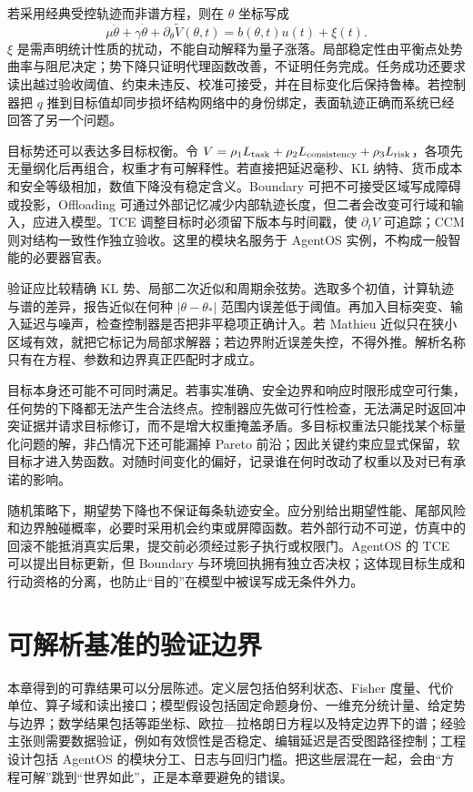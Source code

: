若采用经典受控轨迹而非谱方程，则在 $\theta$ 坐标写成
\[
\mu\ddot\theta+\gamma\dot\theta+\partial_\theta\widetilde V(\theta,t)=b(\theta,t)u(t)+\xi(t).
\]
$\xi$ 是需声明统计性质的扰动，不能自动解释为量子涨落。局部稳定性由平衡点处势曲率与阻尼决定；势下降只证明代理函数改善，不证明任务完成。任务成功还要求读出越过验收阈值、约束未违反、校准可接受，并在目标变化后保持鲁棒。若控制器把 $q$ 推到目标值却同步损坏结构网络中的身份绑定，表面轨迹正确而系统已经回答了另一个问题。

目标势还可以表达多目标权衡。令 $V=\rho_1L_{\rm task}+\rho_2L_{\rm consistency}+\rho_3L_{\rm risk}$，各项先无量纲化后再组合，权重才有可解释性。若直接把延迟毫秒、KL 纳特、货币成本和安全等级相加，数值下降没有稳定含义。Boundary 可把不可接受区域写成障碍或投影，Offloading 可通过外部记忆减少内部轨迹长度，但二者会改变可行域和输入，应进入模型。TCE 调整目标时必须留下版本与时间戳，使 $\partial_tV$ 可追踪；CCM 则对结构一致性作独立验收。这里的模块名服务于 AgentOS 实例，不构成一般智能的必要器官表。

验证应比较精确 KL 势、局部二次近似和周期余弦势。选取多个初值，计算轨迹与谱的差异，报告近似在何种 $|\theta-\theta_*|$ 范围内误差低于阈值。再加入目标突变、输入延迟与噪声，检查控制器是否把非平稳项正确计入。若 Mathieu 近似只在狭小区域有效，就把它标记为局部求解器；若边界附近误差失控，不得外推。解析名称只有在方程、参数和边界真正匹配时才成立。

目标本身还可能不可同时满足。若事实准确、安全边界和响应时限形成空可行集，任何势的下降都无法产生合法终点。控制器应先做可行性检查，无法满足时返回冲突证据并请求目标修订，而不是增大权重掩盖矛盾。多目标权重法只能找某个标量化问题的解，非凸情况下还可能漏掉 Pareto 前沿；因此关键约束应显式保留，软目标才进入势函数。对随时间变化的偏好，记录谁在何时改动了权重以及对已有承诺的影响。

随机策略下，期望势下降也不保证每条轨迹安全。应分别给出期望性能、尾部风险和边界触碰概率，必要时采用机会约束或屏障函数。若外部行动不可逆，仿真中的回滚不能抵消真实后果，提交前必须经过影子执行或权限门。AgentOS 的 TCE 可以提出目标更新，但 Boundary 与环境回执拥有独立否决权；这体现目标生成和行动资格的分离，也防止“目的”在模型中被误写成无条件外力。

\section{可解析基准的验证边界}
\label{sec:conclusion_first_analytical_solution}

本章得到的可靠结果可以分层陈述。定义层包括伯努利状态、Fisher 度量、代价单位、算子域和读出接口；模型假设包括固定命题身份、一维充分统计量、给定势与边界；数学结果包括等距坐标、欧拉—拉格朗日方程以及特定边界下的谱；经验主张则需要数据验证，例如有效惯性是否稳定、编辑延迟是否受图路径控制；工程设计包括 AgentOS 的模块分工、日志与回归门槛。把这些层混在一起，会由“方程可解”跳到“世界如此”，正是本章要避免的错误。

